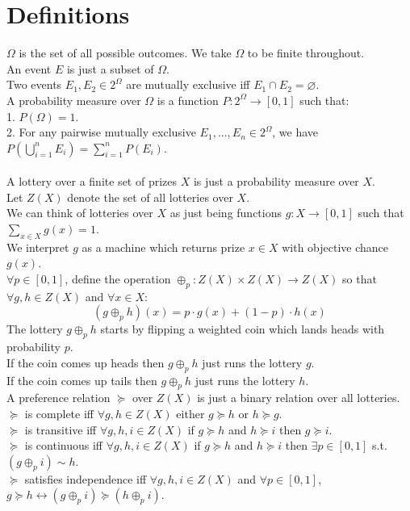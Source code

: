 \documentclass[11pt]{article}
\title{}
\date{}
\theoremstyle{definition}
\theoremstyle{plain}
\begin{document}
\section{Definitions}

$\Omega$ is the set of all possible outcomes. We take $\Omega$ to be finite throughout.
\\
An event $E$ is just a subset of $\Omega$.
\\
Two events $E_1, E_2 \in 2^\Omega$ are mutually exclusive iff $E_1 \cap E_2=\varnothing$.
\\
A probability measure over $\Omega$ is a function $P:2^{\Omega} \to [0,1]$ such that:
\\
1. $P(\Omega)=1$.
\\
2. For any pairwise mutually exclusive $E_1,...,E_n \in 2^{\Omega}$, we have $P(\bigcup_{i=1}^n E_i)=\sum_{i=1}^n P(E_i)$.
\\
\\
A lottery over a finite set of prizes $X$ is just a probability measure over $X$.
\\
Let $Z(X)$ denote the set of all lotteries over $X$.
\\
We can think of lotteries over $X$ as just being functions $g: X \to [0,1]$ such that $\sum_{x \in X} g(x)=1$.
\\
We interpret $g$ as a machine which returns prize $x \in X$ with objective chance $g(x)$.
\\
$\forall p \in [0,1]$, define the operation $\oplus_p: Z(X) \times Z(X) \to Z(X)$ so that $\forall g,h \in Z(X)$ and $\forall x \in X$:
$$(g \oplus_p h)(x)=p\cdot g(x)+(1-p)\cdot h(x)$$
The lottery $g \oplus_p h$ starts by flipping a weighted coin which lands heads with probability $p$. 
\\
If the coin comes up heads then $g \oplus_p h$ just runs the lottery $g$.
\\
If the coin comes up tails then $g \oplus_p h$ just runs the lottery $h$.
\\
A preference relation $\succeq$ over $Z(X)$ is just a binary relation over all lotteries.
\\
$\succeq$ is complete iff $\forall g,h \in Z(X)$ either $g \succeq h$ or $h \succeq g$.
\\
$\succeq$ is transitive iff $\forall g,h,i \in Z(X)$ if $g \succeq h$ and $h \succeq i$ then $g\succeq i$.
\\
$\succeq$ is continuous iff $\forall g,h,i \in Z(X)$ if $g \succeq h$ and $h \succeq i$ then $\exists p \in [0,1]$ s.t. $(g \oplus_p i) \sim h$.
\\
$\succeq$ satisfies independence iff $\forall g,h,i \in Z(X)$ and $\forall p \in [0,1]$, $g \succeq h \leftrightarrow (g \oplus_p i) \succeq (h \oplus_p i).$
\end{document}
